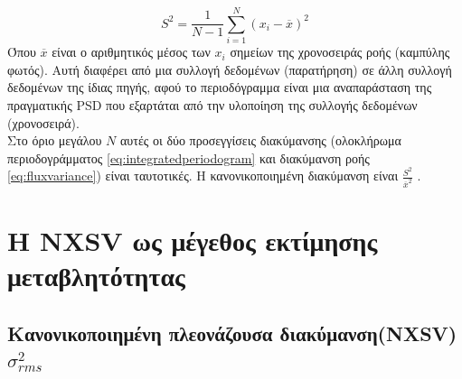 \begin{equation} S^2 = \frac{1}{N-1} \sum_{i=1}^{N} (x_i-\overline{x})^2 \label{eq:fluxvariance}\end{equation}
Όπου $\overline{x}$ είναι ο αριθμητικός μέσος των $x_i$ σημείων της χρονοσειράς ροής (καμπύλης φωτός). Αυτή διαφέρει από μια συλλογή δεδομένων (παρατήρηση) σε άλλη συλλογή δεδομένων της ίδιας πηγής, αφού το περιοδόγραμμα είναι μια αναπαράσταση της πραγματικής \textlatin{PSD} που εξαρτάται από την υλοποίηση της συλλογής δεδομένων (χρονοσειρά).\\
Στο όριο μεγάλου $Ν$ αυτές οι δύο προσεγγίσεις διακύμανσης (ολοκλήρωμα περιοδογράμματος \ref{eq:integratedperiodogram} και διακύμανση ροής \ref{eq:fluxvariance}) είναι ταυτοτικές. Η κανονικοποιημένη διακύμανση είναι $\frac{S^2}{\overline{x}^2}$ \cite{2003MNRAS.345.1271V}.

\section{H \textlatin{NXSV} ως μέγεθος εκτίμησης μεταβλητότητας}

\subsection{Κανονικοποιημένη πλεονάζουσα διακύμανση(\textlatin{NXSV}) $\sigma_{rms}^2$}
 
